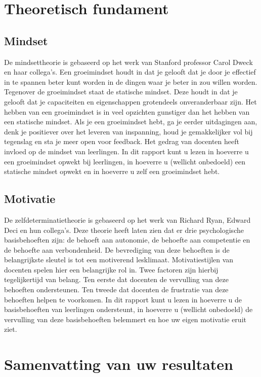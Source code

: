 \documentclass{article}
\begin{document}
\section{Theoretisch fundament}
\subsection{Mindset}
De mindsettheorie is gebaseerd op het werk van Stanford professor Carol Dweck en haar collega’s. Een groeimindset houdt in dat je gelooft dat je door je effectief in te spannen beter kunt worden in de dingen waar je beter in zou willen worden. Tegenover de groeimindset staat de statische mindset. Deze houdt in dat je gelooft dat je capaciteiten en eigenschappen grotendeels onveranderbaar zijn. Het hebben van een groeimindset is in veel opzichten gunstiger dan het hebben van een statische mindset. Als je een groeimindset hebt, ga je eerder uitdagingen aan, denk je positiever over het leveren van inspanning, houd je gemakkelijker vol bij tegenslag en sta je meer open voor feedback. Het gedrag van docenten heeft invloed op de mindset van leerlingen. In dit rapport kunt u lezen in hoeverre u een groeimindset opwekt bij leerlingen, in hoeverre u (wellicht onbedoeld) een statische mindset opwekt en in hoeverre u zelf een groeimindset hebt.

\subsection{Motivatie}
De zelfdeterminatietheorie is gebaseerd op het werk van Richard Ryan, Edward Deci en hun collega’s. Deze theorie heeft laten zien dat er drie psychologische basisbehoeften zijn: de behoeft aan autonomie, de behoefte aan competentie en de behoefte aan verbondenheid. De bevrediging van deze behoeften is de belangrijkste sleutel is tot een motiverend lesklimaat. Motivatiestijlen van docenten spelen hier een belangrijke rol in. Twee factoren zijn hierbij tegelijkertijd van belang. Ten eerste dat docenten de vervulling van deze behoeften ondersteunen. Ten tweede dat docenten de frustratie van deze behoeften helpen te voorkomen. In dit rapport kunt u lezen in hoeverre u de basisbehoeften van leerlingen ondersteunt, in hoeverre u (wellicht onbedoeld) de vervulling van deze basisbehoeften belemmert en hoe uw eigen motivatie eruit ziet.



\section{Samenvatting van uw resultaten}
\end{document}
